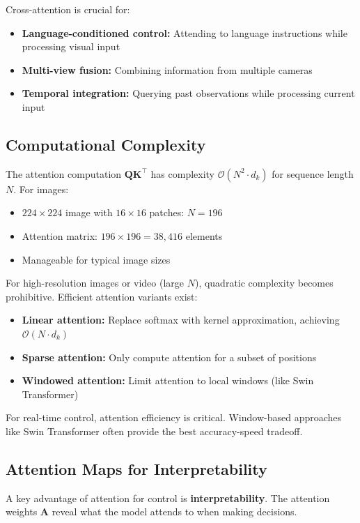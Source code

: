 Cross-attention is crucial for:
\begin{itemize}
    \item \textbf{Language-conditioned control:} Attending to language instructions while processing visual input
    \item \textbf{Multi-view fusion:} Combining information from multiple cameras
    \item \textbf{Temporal integration:} Querying past observations while processing current input
\end{itemize}

\subsection{Computational Complexity}

The attention computation $\mathbf{Q}\mathbf{K}^\top$ has complexity $\mathcal{O}(N^2 \cdot d_k)$ for sequence length $N$. For images:
\begin{itemize}
    \item $224 \times 224$ image with $16 \times 16$ patches: $N = 196$
    \item Attention matrix: $196 \times 196 = 38,416$ elements
    \item Manageable for typical image sizes
\end{itemize}

For high-resolution images or video (large $N$), quadratic complexity becomes prohibitive. Efficient attention variants exist:
\begin{itemize}
    \item \textbf{Linear attention:} Replace softmax with kernel approximation, achieving $\mathcal{O}(N \cdot d_k)$
    \item \textbf{Sparse attention:} Only compute attention for a subset of positions
    \item \textbf{Windowed attention:} Limit attention to local windows (like Swin Transformer)
\end{itemize}

For real-time control, attention efficiency is critical. Window-based approaches like Swin Transformer often provide the best accuracy-speed tradeoff.

\subsection{Attention Maps for Interpretability}

A key advantage of attention for control is \textbf{interpretability}. The attention weights $\mathbf{A}$ reveal what the model attends to when making decisions.

